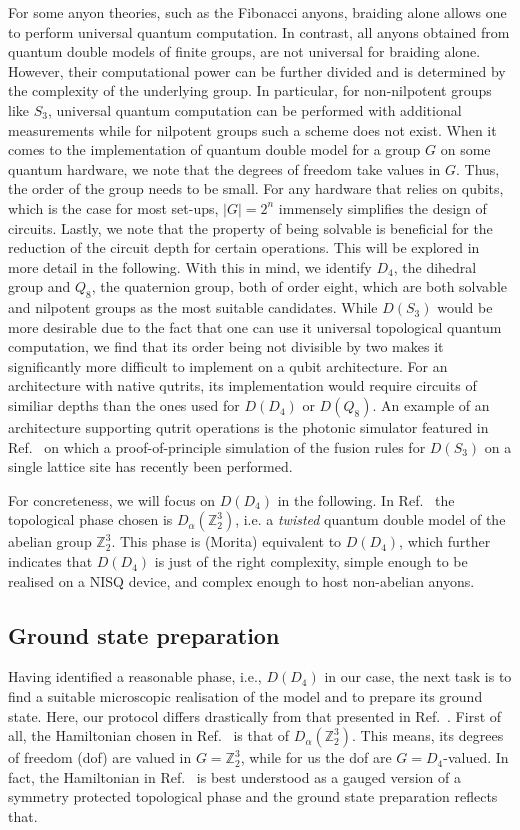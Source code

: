 \documentclass[two column]{article}
\begin{document}
For some anyon theories, such as the Fibonacci anyons, braiding alone allows one to perform universal quantum computation\cite{Freedman2002}. In contrast, all anyons obtained from quantum double models of finite groups, are not universal for braiding alone. However, their computational power can be further divided and is determined by the complexity of the underlying group. In particular, for non-nilpotent groups like $S_3$, universal quantum computation can be performed with additional measurements\cite{Mochon2004} while for nilpotent groups such a scheme does not exist. 
When it comes to the implementation of quantum double model for a group $G$ on some quantum hardware, we note that the degrees of freedom take values in $G$. Thus, the order of the group needs to be small. For any hardware that relies on qubits, which is the case for most set-ups, $|G|=2^n$ immensely simplifies the design of circuits. Lastly, we note that the property of being solvable is beneficial for the reduction of the circuit depth for certain operations. This will be explored in more detail in the following. 
With this in mind, we identify $D_4$, the dihedral group and $Q_8$, the quaternion group, both of order eight, which are both solvable and nilpotent groups as the most suitable candidates.
While $D(S_3)$ would be more desirable due to the fact that one can use it universal topological quantum computation, we find that its order being not divisible by two makes it significantly more difficult to implement on a qubit architecture. For an architecture with native qutrits, its implementation would require circuits of similiar depths than the ones used for $D(D_4)$ or $D(Q_8)$. An example of an architecture supporting qutrit operations is the photonic simulator featured in Ref.~\cite{goel2023unveiling} on which a proof-of-principle simulation of the fusion rules for $D(S_3)$ on a single lattice site has recently been performed. 

For concreteness, we will focus on $D(D_4)$ in the following. In Ref.~\cite{iqbal2023creation} the topological phase chosen is $D_\alpha(\mathbb Z_2^3)$, i.e. a \emph{twisted} quantum double model of the abelian group $\mathbb Z_2^3$. This phase is (Morita) equivalent to $D(D_4)$\cite{mapping, propitius1995topological}, which further indicates that $D(D_4)$ is just of the right complexity, simple enough to be realised on a NISQ device, and complex enough to host non-abelian anyons.
\subsection{Ground state preparation}
Having identified a reasonable phase, i.e., $D(D_4)$ in our case, the next task is to find a suitable microscopic realisation of the model and to prepare its ground state. Here, our protocol differs drastically from that presented in Ref.~\cite{iqbal2023creation}. First of all, the Hamiltonian chosen in Ref.~\cite{iqbal2023creation} is that of $D_\alpha(\mathbb Z_2^3)$. This means, its degrees of freedom (dof) are valued in $G=\mathbb Z_2^3$, while for us the dof are $G=D_4$-valued. In fact, the Hamiltonian in Ref.~\cite{iqbal2023creation} is best understood as a gauged version of a symmetry protected topological phase and the ground state preparation reflects that. 
\end{document}
